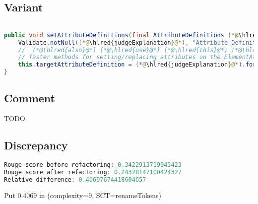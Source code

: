\documentclass[11pt]{article}
\DeclareRobustCommand{\hlred}[1]{{\sethlcolor{YellowOrange}\hl{#1}}}
\begin{document}
\subsection{Variant}

\begin{lstlisting}[language=java]

public void setAttributeDefinitions(final AttributeDefinitions (*@\hlred{judgeExplanation}@*)) {
    Validate.notNull((*@\hlred{judgeExplanation}@*), "Attribute Definitions cannot be null");
    //  (*@\hlred{also}@*) (*@\hlred{use}@*) (*@\hlred{this}@*) (*@\hlred{as}@*) (*@\hlred{alternative}@*) (*@\hlred{or}@*) (*@\hlred{add}@*) (*@\hlred{to}@*) (*@\hlred{a}@*) (*@\hlred{group}@*) (*@\hlred{with}@*) (*@\hlred{other}@*) (*@\hlred{groups}@*) (*@\hlred{for}@*) (*@\hlred{performance}@*) (*@\hlred{in}@*)
    // faster methods for setting/replacing attributes on the ElementAttributes implementation
    this.targetAttributeDefinition = (*@\hlred{judgeExplanation}@*).forName(TEMPLATE_MODE, TARGET_ATTR_NAME);
}
\end{lstlisting}

\subsection{Comment}

TODO.

\subsection{Discrepancy}

\begin{lstlisting}[language=java]
Rouge score before refactoring: 0.3422913719943423
Rouge score after refactoring: 0.24328147100424327
Relative difference: 0.40697674418604657
\end{lstlisting}

Put 0.4069 in (complexity=9, SCT=renameTokens)
\end{document}

